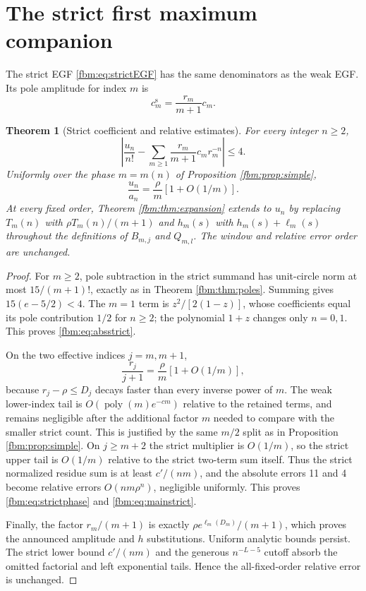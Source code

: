 \documentclass[11pt]{article}
\newtheorem{theorem}{Theorem}[section]
\theoremstyle{remark}\newtheorem{remark}[theorem]{Remark}
\newcommand{\abs}[1]{\left|#1\right|}
\begin{document}
\section{The strict first maximum companion}\label{fbm:sec:strict}
The strict EGF \eqref{fbm:eq:strictEGF} has the same denominators as the weak EGF. Its pole amplitude for index $m$ is
\[
 c_m^{\mathrm s}=\frac{r_m}{m+1}c_m.
\]
\begin{theorem}[Strict coefficient and relative estimates]\label{fbm:thm:strict}
For every integer $n\geq2$,
\begin{equation}\label{fbm:eq:absstrict}
 \abs{\frac{u_n}{n!}-\sum_{m\geq1}\frac{r_m}{m+1}c_mr_m^{-n}}\leq4.
\end{equation}
Uniformly over the phase $m=m(n)$ of Proposition \ref{fbm:prop:simple},
\begin{equation}\label{fbm:eq:strictphase}
 \frac{u_n}{a_n}=\frac{\rho}{m}[1+O(1/m)].
\end{equation}
At every fixed order, Theorem \ref{fbm:thm:expansion} extends to $u_n$ by replacing $T_m(n)$ with $\rho T_m(n)/(m+1)$ and $h_m(s)$ with $h_m(s)+\ell_m(s)$ throughout the definitions of $B_{m,j}$ and $Q_{m,l}$. The window and relative error order are unchanged.
\end{theorem}

\begin{proof}
For $m\geq2$, pole subtraction in the strict summand has unit-circle norm at most $15/(m+1)!$, exactly as in Theorem \ref{fbm:thm:poles}. Summing gives $15(e-5/2)<4$. The $m=1$ term is $z^2/[2(1-z)]$, whose coefficients equal its pole contribution $1/2$ for $n\geq2$; the polynomial $1+z$ changes only $n=0,1$. This proves \eqref{fbm:eq:absstrict}.

On the two effective indices $j=m,m+1$,
\[
 \frac{r_j}{j+1}=\frac{\rho}{m}[1+O(1/m)],
\]
because $r_j-\rho\leq D_j$ decays faster than every inverse power of $m$. The weak lower-index tail is $O(\operatorname{poly}(m)e^{-cm})$ relative to the retained terms, and remains negligible after the additional factor $m$ needed to compare with the smaller strict count. This is justified by the same $m/2$ split as in Proposition \ref{fbm:prop:simple}. On $j\geq m+2$ the strict multiplier is $O(1/m)$, so the strict upper tail is $O(1/m)$ relative to the strict two-term sum itself. Thus the strict normalized residue sum is at least $c'/(nm)$, and the absolute errors 11 and 4 become relative errors $O(nm\rho^n)$, negligible uniformly. This proves \eqref{fbm:eq:strictphase} and \eqref{fbm:eq:mainstrict}.

Finally, the factor $r_m/(m+1)$ is exactly $\rho e^{\ell_m(D_m)}/(m+1)$, which proves the announced amplitude and $h$ substitutions. Uniform analytic bounds persist. The strict lower bound $c'/(nm)$ and the generous $n^{-L-5}$ cutoff absorb the omitted factorial and left exponential tails. Hence the all-fixed-order relative error is unchanged.
\end{proof}
\end{document}
